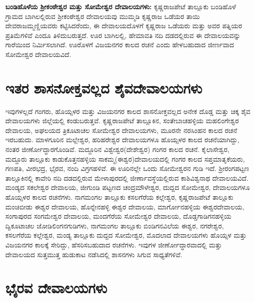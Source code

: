 \textbf{ಬಂಡಿಹೊಳೆಯ ಶ‍್ರೀಕಂಠೇಶ್ವರ ಮತ್ತು ಸೋಮೇಶ್ವರ ದೇವಾಲಯಗಳು:} ಕೃಷ್ಣರಾಜಪೇಟೆ ತಾಲ್ಲೂಕು ಬಂಡಿಹೊಳೆ ಗ್ರಾಮದ ಬಾಗಿಲಲ್ಲಿರುವ ಶ‍್ರೀಕಂಠೇಶ್ವರ ದೇವಾಲಯವು ಮುಮ್ಮಡಿ ಕೃಷ್ಣರಾಜ ಒಡೆಯರ ತಾಯಿ ದೇವರಾಜಮ್ಮಣ್ಣಿಯವರು ಕಟ್ಟಿಸಿದರೆಂದು, ಈ ದೇವಾಲಯದೊಳಗೆ ಕೃಷ್ಣರಾಜ ಒಡೆಯರು ಮತ್ತು ಅವರ ಪತ್ನಿಯರ ಪ್ರತಿಮೆಗಳಿವೆ ಎಂದೂ ತಿಳಿದುಬರುತ್ತದೆ. ಊರ ಬಾಗಿಲಲ್ಲಿ, ಹೇಮಾವತಿ ನದಿ ದಡದಲ್ಲಿರುವ ಈ ದೇವಾಲಯವನ್ನು ಗಾರೆಯಿಂದ ನಿರ್ಮಿಸಲಾಗಿದೆ. ಊರೊಳಗೆ ವಿಜಯನಗರ ಕಾಲದ ರಚನೆ ಎಂದು ಹೇಳಬಹುದಾದ ಜೀರ್ಣವಾದ ಸೋಮೇಶ್ವರ ದೇವಾಲಯವಿದೆ.


\section{ಇತರ ಶಾಸನೋಕ್ತವಲ್ಲದ ಶೈವದೇವಾಲಯಗಳು}

ಇವುಗಳಲ್ಲದೆ ಗಂಗರು, ಹೊಯ್ಸಳರ ಮತ್ತು ವಿಜಯನಗರ ಕಾಲದ ಶಾಸನೋಕ್ತವಲ್ಲದ ಅನೇಕ ದೊಡ್ಡ ಮತ್ತು ಚಿಕ್ಕ ಶೈವ ದೇವಾಲಯಗಳು ಜಿಲ್ಲೆಯಲ್ಲಿ ಕಂಡುಬರುತ್ತವೆ. ಕೃಷ್ಣರಾಜಪೇಟೆ ತಾಲ್ಲೂಕಿನ, ಸಂತೇಬಾಚಹಳ್ಳಿಯ ಮಹಲಿಂಗೇಶ್ವರ ದೇವಾಲಯ, ಅಘಲಯದ ತ್ರಿಕೂಟಾಚಲ ಸೋಮೇಶ್ವರ ದೇವಾಲಯಗಳು, ಮೂರನೇ ನರಸಿಂಹನ ಕಾಲದ ರಚನೆ ಇರಬಹುದು. ಮಾಳಗೂರಿನ ಮಲ್ಲೇಶ್ವರ, ಹರಿಹರೇಶ್ವರ ದೇವಾಲಯಗಳೂ ಹೊಯ್ಸಳರ ಕಾಲದ ರಚನೆಯಾಗಿದ್ದು, ನಂತರ ಜೀರ್ಣೋದ್ಧಾರಗೊಂಡಿವೆ. ಮದ್ದೂರಿನ ವಿಶ್ವೇಶ್ವರ(ದೇಶೇಶ್ವರ) ಗಂಗರ ಕಾಲದ ರಚನೆ. ಕೈಲಾಸೇಶ್ವರ, ಮದ್ದೂರು ತಾಲ್ಲೂಕು ಕಾಡುಕೊತ್ತನಹಳ್ಳಿಯ ಸಾಕಮ್ಮ(ಈಶ್ವರ)ದೇವಾಲಯದಲ್ಲಿ ಗಂಗರ ಕಾಲದ ಸಪ್ತಮಾತೃಕೆಯರು, ಗಣಪತಿ, ವೀರಭದ್ರ, ಭೈರವ, ನಂದಿ ವಿಗ್ರಗಹಳಿವೆ. ಈ ಊರಿನಲ್ಲೇ ಒಂದು ಸೋಮೇಶ್ವರನ ಗುಡಿ ಇದೆ. ಶ‍್ರೀರಂಗಪಟ್ಟಣ ತಾಲ್ಲೂಕಿನಲ್ಲಿ ಕಾವೇರಿ ನದಿ ದಡದಲ್ಲಿರುವ ಮೇಳಾಪುರದಲ್ಲಿ ಜೀರ್ಣಾವಸ್ಥೆಯಲ್ಲಿರುವ ಕಾಶಿವಿಶ್ವನಾಥ ದೇವಾಲಯವಿದೆ. ಮಂಡ್ಯದ ಸಕಲೇಶ್ವರ ದೇವಾಲಯ, ಜೀಗುಂಡಿ ಪಟ್ಟಣದ ಚಂದ್ರಮೌಳೇಶ್ವರ, ದುದ್ದದ ಸೋಮೇಶ್ವರ, ದೇವಾಲಯಗಳೂ ಹೊಯ್ಸಳರ ಕಾಲದ ರಚನೆಗಳು. ನಾಗಮಂಗಲ ತಾಲ್ಲೂಕು ಕಸಲಗೆರೆಯ ಕಲ್ಲೇಶ್ವರ, ಕೃಷ್ಣರಾಜಪೇಟೆ ತಾಲ್ಲೂಕು ಮಂಚಿಬೀಡು ಈಶ್ವರ ದೇವಾಲಯ, ಹೊನ್ನೇನಹಳ್ಳಿ ಈಶ್ವರ ದೇವಾಲಯ, ಮಾರ್ಗೋನಹಳ್ಳಿಯ ಈಶ್ವರದೇವಾಲಯ, ಸಂಗಾಪುರದ ಸಂಗಮೇಶ್ವರ ದೇವಾಲಯ, ಮಂದಗೆರೆಯ ಸೋಮೇಶ್ವರ ದೇವಾಲಯ, ದೊಡ್ಡಗಾಡಿಗನಹಳ್ಳಿಯ ದ್ವಿಕೂಟಾಚಲ ಜೋಡಿಲಿಂಗನಗುಡಿಗಳು, ನಾಗಮಂಗಲ ತಾಲ್ಲೂಕು ಬಿಂಡಿಗನವಿಲೆಯ ಈಶ್ವರ, ನಗರೇಶ್ವರ, ಕಸಲಗೆರೆಯ ಕಲ್ಲೇಶ್ವರ, ಮಂಡ್ಯ ತಾಲ್ಲೂಕು ದುದ್ದದ ಸೋಮೇಶ್ವರ, ಮೊದಲಾದ ದೇವಾಲಯಗಳು ಹೊಯ್ಸಳ ಮತ್ತು ವಿಜಯನಗರ ಕಾಲಕ್ಕೆ ಸೇರಿದ್ದು, ಹೆಸರಿಸಬಹುದಾದ ರಚನೆಗಳು. ಇವುಗಳ ಜೀರ್ಣೋದ್ಧಾರವಾದಲ್ಲಿ ಮತ್ತು ದೇವಾಲಯದ ಸುತ್ತಮುತ್ತ ಹುಡುಕಾಟ ನಡೆಸಿದಲ್ಲಿ ಶಾಸನಗಳು ಸಿಗುವ ಸಾಧ್ಯತೆಗಳಿವೆ.


\section{ಭೈರವ ದೇವಾಲಯಗಳು}

